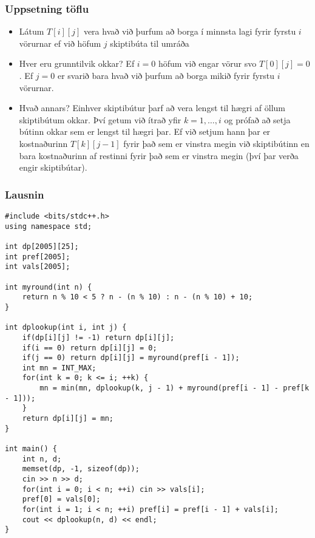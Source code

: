 \documentclass{beamer}
\begin{document}
\begin{frame}
\frametitle{Uppsetning töflu}

\begin{itemize}

\item<1-> Látum $T[i][j]$ vera hvað við þurfum að borga í minnsta lagi fyrir fyrstu $i$ vörurnar ef við höfum $j$ skiptibúta til umráða

\item<2-> Hver eru grunntilvik okkar? Ef $i = 0$ höfum við engar vörur svo $T[0][j] = 0$. Ef $j = 0$ er svarið bara hvað við þurfum að borga mikið fyrir fyrstu $i$ vörurnar. 

\item<3-> Hvað annars? Einhver skiptibútur þarf að vera lengst til hægri af öllum skiptibútum okkar. Því getum við ítrað yfir $k = 1,\dots,i$ og prófað að setja bútinn okkar sem er lengst til hægri þar. Ef við setjum hann þar er kostnaðurinn $T[k][j-1]$ fyrir það sem er vinstra megin við skiptibútinn en bara kostnaðurinn af restinni fyrir það sem er vinstra megin (því þar verða engir skiptibútar).

\end{itemize}

\end{frame}

\begin{frame}[fragile]
\frametitle{Lausnin}

\begin{tiny}
\begin{verbatim}
#include <bits/stdc++.h>
using namespace std;

int dp[2005][25];
int pref[2005];
int vals[2005];

int myround(int n) {
    return n % 10 < 5 ? n - (n % 10) : n - (n % 10) + 10;
}

int dplookup(int i, int j) {
    if(dp[i][j] != -1) return dp[i][j];
    if(i == 0) return dp[i][j] = 0;
    if(j == 0) return dp[i][j] = myround(pref[i - 1]);
    int mn = INT_MAX;
    for(int k = 0; k <= i; ++k) {
        mn = min(mn, dplookup(k, j - 1) + myround(pref[i - 1] - pref[k - 1]));
    }
    return dp[i][j] = mn;
}

int main() {
    int n, d;
    memset(dp, -1, sizeof(dp));
    cin >> n >> d;
    for(int i = 0; i < n; ++i) cin >> vals[i];
    pref[0] = vals[0];
    for(int i = 1; i < n; ++i) pref[i] = pref[i - 1] + vals[i];
    cout << dplookup(n, d) << endl;
}
\end{verbatim}
\end{tiny}

\end{frame}
\end{document}
